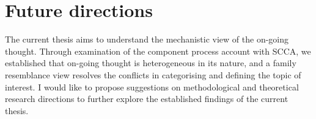 


\section{Future directions}
\label{ch:discussion:future}
The current thesis aims to understand the mechanistic view of the on-going thought. Through examination of the component process account with SCCA, we established that on-going thought is heterogeneous in its nature, and a family resemblance view resolves the conflicts in categorising and defining the topic of interest. I would like to propose suggestions on methodological and theoretical research directions to further explore the established findings of the current thesis.

